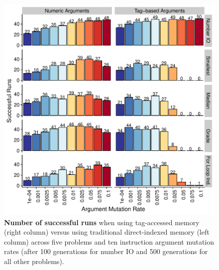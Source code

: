 \begin{figure}
  \centering
  \includegraphics[width=0.75\columnwidth]{chapters/06-tag-access-memory/media/problem-solving-success.pdf}
  \caption{\small 
  \textbf{Number of successful runs} when using tag-accessed memory (right column) versus using traditional direct-indexed memory (left column) across five problems and ten instruction argument mutation rates (after 100 generations for number IO and 500 generations for all other problems).
  }
  \label{chapter:tag-accessed-memory:fig:successful-runs}
\end{figure}